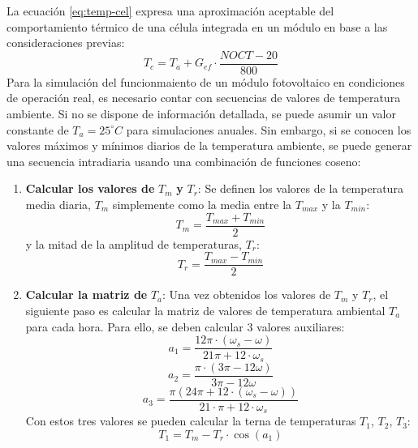 La ecuación \ref{eq:temp-cel} expresa una aproximación aceptable del comportamiento térmico de una célula integrada en un módulo en base a las consideraciones previas:
\begin{equation}
T_c=T_a+G_{ef}\cdot \frac{NOCT-20}{800}
\label{eq:temp-cel}
\end{equation}
Para la simulación del funcionmaiento de un módulo fotovoltaico en condiciones de operación real, es necesario contar con secuencias de valores de temperatura ambiente. Si no se dispone de información detallada, se puede asumir un valor constante de \(T_a=25^\circ C\) para simulaciones anuales. Sin embargo, si se conocen los valores máximos y mínimos diarios de la temperatura ambiente, se puede generar una secuencia intradiaria usando una combinación de funciones coseno:
\begin{enumerate}
\item \textbf{Calcular los valores de} \(T_m\) \textbf{y} \(T_r\): Se definen los valores de la temperatura media diaria, \(T_m\) simplemente como la media entre la \(T_{max}\) y la \(T_{min}\):
\begin{equation}
T_m=\frac{T_{max}+T_{min}}{2}
\end{equation}
y la mitad de la amplitud de temperaturas, \(T_r\):
\begin{equation}
T_r=\frac{T_{max}-T_{min}}{2}
\end{equation}
\item \textbf{Calcular la matriz de} \(T_a\): Una vez obtenidos los valores de \(T_m\) y \(T_r\), el siguiente paso es calcular la matriz de valores de temperatura ambiental \(T_a\) para cada hora. Para ello, se deben calcular 3 valores auxiliares:
\begin{equation}
a_1=\frac{12\pi \cdot (\omega_s-\omega)}{21\pi+12\cdot \omega_s}
\end{equation}
\begin{equation}
a_2=\frac{\pi \cdot (3\pi -12\omega)}{3\pi - 12\omega}
\end{equation}
\begin{equation}
a_3=\frac{\pi (24\pi + 12 \cdot (\omega_s - \omega))}{21 \cdot \pi + 12 \cdot \omega_s}
\end{equation}
Con estos tres valores se pueden calcular la terna de temperaturas \(T_1\), \(T_2\), \(T_3\):
\begin{equation}
T_1 = T_m-T_r\cdot\cos(a_1)

\end{equation}
\end{enumerate}
